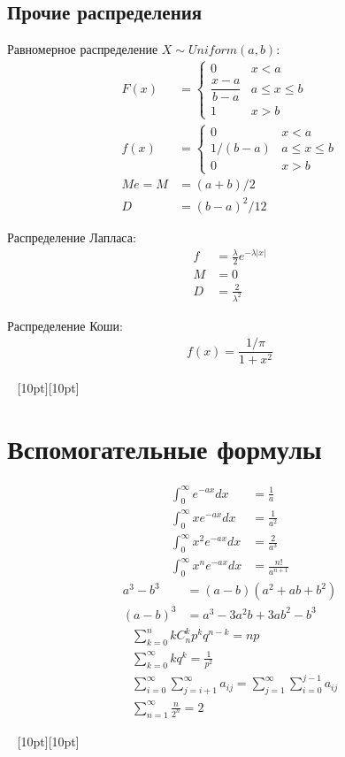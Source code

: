 \documentclass[a4paper,12pt,fleqn]{article}
\numberwithin{figure}{section}
\theoremstyle{definition}
\let\leqs\leqslant
\def\vignette{\vspace{48pt} \noindent \hrulefill~
	          \raisebox{-8pt}[10pt][10pt]{\Huge\ding{102}}
	          ~\hrulefill}
\begin{document}
\subsection{Прочие распределения}

Равномерное распределение $X \sim Uniform(a,b)$:
\begin{align*}
	   F(x) &=
	   		\begin{cases}
	   			0	& x<a \\
		   		\dfrac{x-a}{b-a}	& a \leqs x \leqs b \\
		   		1	& x>b
			\end{cases}
	\\ f(x) &= \begin{cases}
				0		& x<a \\
				1/(b-a)	& a \leqs x \leqs b \\
				0		& x>b
			\end{cases}
	\\ Me = M &= (a+b)/2
	\\ D &= (b-a)^2/12
\end{align*}


Распределение Лапласа:
\begin{align*}
	   f &= \frac{\lambda}2 e^{-\lambda|x|}
	\\ M &= 0
	\\ D &= \frac{2}{\lambda^2}
\end{align*}


Распределение Коши:
\begin{align*}
	   f(x)=\dfrac{1/\pi}{1+x^2}
\end{align*}


\vignette
\section{Вспомогательные формулы}

\begin{align*}
	   \int_0^\infty     e^{-ax}dx &= \frac{1}{a}
	\\ \int_0^\infty x   e^{-ax}dx &= \frac{1}{a^2}
	\\ \int_0^\infty x^2 e^{-ax}dx &= \frac{2}{a^3}
	\\ \int_0^\infty x^n e^{-ax}dx &= \frac{n!}{a^{n+1}}
\end{align*}
\begin{align*}
	   a^3-b^3 &= (a-b)(a^2+ab+b^2)
	\\ (a-b)^3 &= a^3-3a^2b+3ab^2-b^3
\end{align*}
\begin{align*}
&	\sum_{k=0}^n k C_n^k p^k q^{n-k} = np \\
&	\sum_{k=0}^{\infty}kq^k = \frac{1}{p^2} \\
&	\sum_{i=0}^{\infty}\sum_{j=i+1}^{\infty}a_{ij} =
	\sum_{j=1}^{\infty}\sum_{i=0}^{j-1}a_{ij} \\
&	\sum_{n=1}^{\infty}\frac{n}{2^n} = 2
\end{align*}

\vignette
\end{document}
